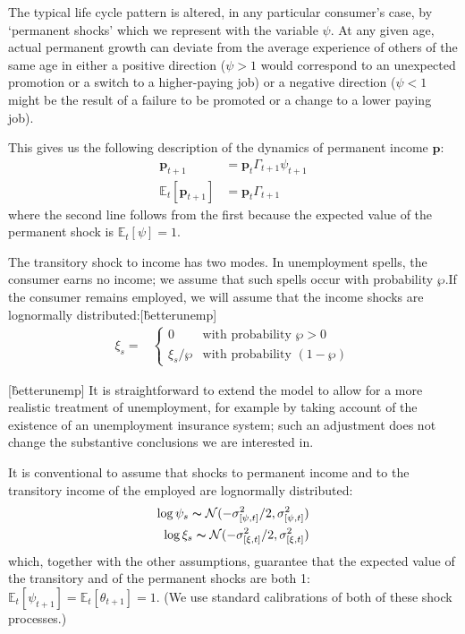 \documentclass{article}
\newcommand{\pLvl}{\mathbf{p}}
\newcommand{\Ex}{\mathbb{E}}
\newcommand{\permGroFac}{\Gamma}
\newcommand{\permShk}{\psi}
\newcommand{\pZero}{\wp}
\newcommand{\tranShkEmp}{\xi}
\newcommand{\tranShk}{\theta}
\begin{document}
The typical life cycle pattern is altered, in any particular consumer's case, by `permanent shocks' which we represent with the variable $\permShk$. At any given age, actual permanent growth can deviate from the average experience of others of the same age in either a positive direction ($\psi>1$ would correspond to an unexpected promotion or a switch to a higher-paying job) or a negative direction ($\psi < 1$ might be the result of a failure to be promoted or a change to a lower paying job).

This gives us the following description of the dynamics of permanent income $\pLvl$:
\begin{align}
    \pLvl_{t+1} & = \pLvl_{t} \permGroFac_{t+1} \permShk_{t+1}
    \\ \Ex_{t}[\pLvl_{t+1}] & = \pLvl_{t} \permGroFac_{t+1}
\end{align}
where the second line follows from the first because the expected value of the permanent shock is $\Ex_{t}[\permShk]=1$.

The transitory shock to income has two modes. In unemployment spells, the consumer earns no income; we assume that such spells occur with probability $\pZero$.If the consumer remains employed, we will assume that the income shocks are lognormally distributed:[\^betterunemp]
\begin{align}
    \tranShkEmp_{s} = &
    \begin{cases}
        0\phantom{/\pZero} & \text{with probability $\pZero>0$}
        \\ \xi_{s}/\pZero & \text{with probability $(1-\pZero)$}
    \end{cases}
\end{align}

[\^betterunemp] It is straightforward to extend the model to allow for a more realistic treatment of unemployment, for example by taking account of the existence of an unemployment insurance system; such an adjustment does not change the substantive conclusions we are interested in.

It is conventional to assume that shocks to permanent income and to the transitory income of the employed are lognormally distributed:
\begin{align}
    \log \permShk_{s} \thicksim \mathcal{N}(-\sigma_{[\permShk, t]}^{2}/2,\sigma_{[\permShk, t]}^{2})
    \\ \log \xi_{s}\thicksim \mathcal{N}(-\sigma_{[\xi, t]}^{2}/2,\sigma_{[\xi, t]}^{2})
\end{align}
which, together with the other assumptions, guarantee that the expected value of the transitory and of the permanent shocks are both 1: $\Ex_{t}[\permShk_{t+1}]=\Ex_{t}[\tranShk_{t+1}]=1$. (We use standard calibrations of both of these shock processes.)
\end{document}
